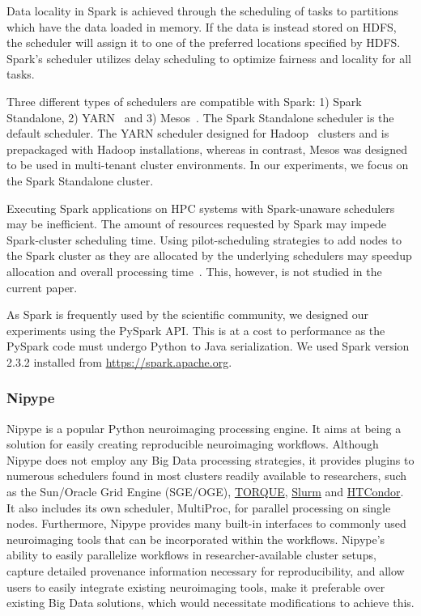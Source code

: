 Data locality in Spark is achieved through the scheduling of tasks to partitions 
which have the
data loaded in memory. If the data is instead stored on HDFS, the scheduler will
assign it to one of the preferred locations specified by HDFS. Spark's scheduler
utilizes delay scheduling to optimize fairness and locality for all tasks.

Three different types of schedulers are compatible with Spark: 1) Spark 
Standalone, 2) YARN~\cite{vavilapalli2013apache} and 3) Mesos~\cite{hindman2011mesos}. The Spark Standalone
scheduler is the default scheduler. The YARN scheduler designed for Hadoop~\cite{white2012hadoop}
clusters and is prepackaged with Hadoop installations, whereas in contrast, 
Mesos was designed to be used in multi-tenant cluster environments. In our experiments,
we focus on the Spark Standalone cluster.

Executing Spark applications on HPC systems with Spark-unaware schedulers may
be inefficient. The amount of resources requested by Spark may impede 
Spark-cluster scheduling time. Using pilot-scheduling strategies to add 
nodes to the Spark cluster as they are allocated by the underlying 
schedulers may speedup allocation and overall processing time~\cite{paraskevakos2018pilot}. This, however, is not studied in the 
current paper.

As Spark is frequently used by the scientific community, we designed 
our experiments using the PySpark API. This is at a cost to performance 
as the PySpark code must undergo Python to Java serialization. We used Spark
version 2.3.2 installed from \url{https://spark.apache.org}.

\subsubsection{Nipype}

Nipype is a popular Python neuroimaging processing engine. It aims at being a 
solution for easily creating reproducible neuroimaging workflows. Although Nipype
does not employ any Big Data processing strategies, it provides plugins to numerous
schedulers found in most clusters readily available to researchers, 
such as the Sun/Oracle Grid Engine (SGE/OGE), \href{http://www.adaptivecomputing.com/products/torque/}{TORQUE},
\href{https://slurm.schedmd.com/}{Slurm} and \href{https://research.cs.wisc.edu/htcondor/}{HTCondor}. It also includes its own scheduler, MultiProc,
for parallel processing on single nodes. Furthermore, Nipype provides many built-in 
interfaces to commonly used neuroimaging tools that can be incorporated within the 
workflows. Nipype's ability to easily parallelize workflows in researcher-available 
cluster setups, capture detailed provenance information necessary for reproducibility,
and allow users to easily integrate existing neuroimaging tools, make it preferable
over existing Big Data solutions, which would necessitate modifications to achieve this.

